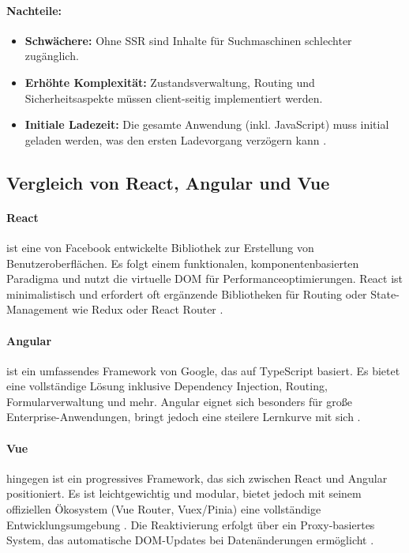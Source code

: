 \paragraph{Nachteile:}
\begin{itemize}
	\item \textbf{Schwächere:} Ohne \ac{SSR} sind Inhalte für Suchmaschinen schlechter zugänglich.
	\item \textbf{Erhöhte Komplexität:} Zustandsverwaltung, Routing und Sicherheitsaspekte müssen client-seitig implementiert werden.
	\item \textbf{Initiale Ladezeit:} Die gesamte Anwendung (inkl. JavaScript) muss initial geladen werden, was den ersten Ladevorgang verzögern kann \cite{Bacancy2023}.
\end{itemize}

\subsection{Vergleich von React, Angular und Vue}

\paragraph{React} ist eine von Facebook entwickelte Bibliothek zur Erstellung von Benutzeroberflächen. Es folgt einem funktionalen, komponentenbasierten Paradigma und nutzt die virtuelle \ac{DOM} für Performanceoptimierungen. React ist minimalistisch und erfordert oft ergänzende Bibliotheken für Routing oder State-Management wie Redux oder React Router \cite{ReactDoc2025}.

\paragraph{Angular} ist ein umfassendes Framework von Google, das auf TypeScript basiert. Es bietet eine vollständige Lösung inklusive Dependency Injection, Routing, Formularverwaltung und mehr. Angular eignet sich besonders für große Enterprise-Anwendungen, bringt jedoch eine steilere Lernkurve mit sich \cite{AngularDocs2025}.

\paragraph{Vue} hingegen ist ein progressives Framework, das sich zwischen React und Angular positioniert. Es ist leichtgewichtig und modular, bietet jedoch mit seinem offiziellen Ökosystem (Vue Router, Vuex/Pinia) eine vollständige Entwicklungsumgebung \cite{VueCoreTeam2016}. Die Reaktivierung erfolgt über ein Proxy-basiertes System, das automatische DOM-Updates bei Datenänderungen ermöglicht \cite{VueReactivity2016}.